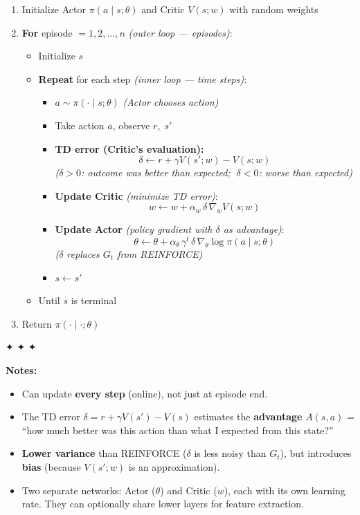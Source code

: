 \documentclass[11pt]{article}
\providecommand{\tightlist}{%
      \setlength{\itemsep}{0pt}\setlength{\parskip}{0pt}}
\begin{document}
\begin{enumerate}
\def\labelenumi{\arabic{enumi}.}
\item
  Initialize Actor \(\pi(a \mid s;\theta)\) and Critic \(V(s;w)\) with
  random weights
\item
  \textbf{For} episode \(= 1, 2, \ldots, n\) \emph{(outer loop ---
  episodes)}:

  \begin{itemize}
  \tightlist
  \item
    Initialize \(s\)
  \item
    \textbf{Repeat} for each step \emph{(inner loop --- time steps)}:

    \begin{itemize}
    \tightlist
    \item
      \(a \sim \pi(\cdot \mid s;\theta)\) \emph{(Actor chooses action)}
    \item
      Take action \(a\), observe \(r,\; s'\)
    \item
      \textbf{TD error (Critic's evaluation):}
      \[\delta \leftarrow r + \gamma V(s';w) - V(s;w)\]
      \emph{(\(\delta > 0\): outcome was better than expected;
      \(\;\delta < 0\): worse than expected)}
    \item
      \textbf{Update Critic} \emph{(minimize TD error)}:
      \[w \leftarrow w + \alpha_w\, \delta\, \nabla_w V(s;w)\]
    \item
      \textbf{Update Actor} \emph{(policy gradient with \(\delta\) as
      advantage)}:
      \[\theta \leftarrow \theta + \alpha_\theta\, \gamma^t\, \delta\, \nabla_\theta \log \pi(a \mid s;\theta)\]
      \emph{(\(\delta\) replaces \(G_t\) from REINFORCE)}
    \item
      \(s \leftarrow s'\)
    \end{itemize}
  \item
    Until \(s\) is terminal
  \end{itemize}
\item
  Return \(\pi(\cdot \mid \cdot;\theta)\)
\end{enumerate}

✦ ✦ ✦

\textbf{Notes:}

\begin{itemize}
\tightlist
\item
  Can update \textbf{every step} (online), not just at episode end.
\item
  The TD error \(\delta = r + \gamma V(s') - V(s)\) estimates the
  \textbf{advantage} \(A(s,a)\) = ``how much better was this action than
  what I expected from this state?''
\item
  \textbf{Lower variance} than REINFORCE (\(\delta\) is less noisy than
  \(G_t\)), but introduces \textbf{bias} (because \(V(s';w)\) is an
  approximation).
\item
  Two separate networks: Actor (\(\theta\)) and Critic (\(w\)), each
  with its own learning rate. They can optionally share lower layers for
  feature extraction.
\end{itemize}
\end{document}
